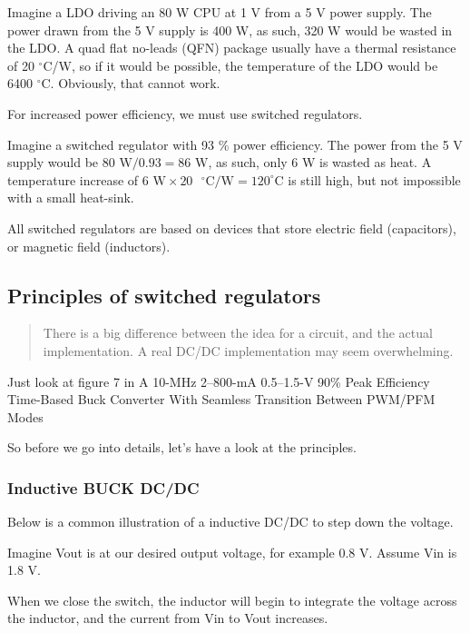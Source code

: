 Imagine a LDO driving an 80 W CPU at 1 V from a 5 V power supply. The
power drawn from the 5 V supply is 400 W, as such, 320 W would be wasted
in the LDO. A quad flat no-leads (QFN) package usually have a thermal
resistance of 20 \(^{\circ}\)C/W, so if it would be possible, the
temperature of the LDO would be 6400 \(^{\circ}\)C. Obviously, that
cannot work.

For increased power efficiency, we must use switched regulators.

Imagine a switched regulator with 93 \% power efficiency. The power from
the 5 V supply would be \(80\text{ W}/ 0.93 = 86\text{ W}\), as such,
only 6 W is wasted as heat. A temperature increase of
\(6\text{ W} \times 20\text{ } ^{\circ}\text{C/W}  = 120 ^{\circ}\)C is
still high, but not impossible with a small heat-sink.

All switched regulators are based on devices that store electric field
(capacitors), or magnetic field (inductors).

\subsection{Principles of switched
regulators}\label{principles-of-switched-regulators}

\begin{quote}
There is a big difference between the idea for a circuit, and the actual
implementation. A real DC/DC implementation may seem overwhelming.
\end{quote}

Just look at figure 7 in A 10-MHz 2--800-mA 0.5--1.5-V 90\% Peak
Efficiency Time-Based Buck Converter With Seamless Transition Between
PWM/PFM Modes 

So before we go into details, let's have a look at the principles.

\subsubsection{Inductive BUCK DC/DC}\label{inductive-buck-dcdc}

Below is a common illustration of a inductive DC/DC to step down the
voltage.

Imagine Vout is at our desired output voltage, for example 0.8 V. Assume
Vin is 1.8 V.

When we close the switch, the inductor will begin to integrate the
voltage across the inductor, and the current from Vin to Vout increases.

